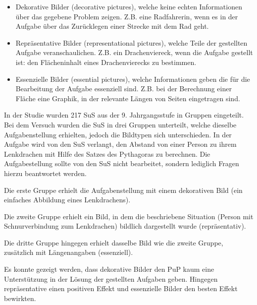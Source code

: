     \begin{itemize}
        \item Dekorative Bilder (decorative pictures), welche keine echten Informationen über das gegebene Problem zeigen. Z.B. eine Radfahrerin, wenn es in der Aufgabe über das Zurücklegen einer Strecke mit dem Rad geht.
        \item Repräsentative Bilder (representational pictures), welche Teile der gestellten Aufgabe veranschaulichen. Z.B. ein Drachenviereck, wenn die Aufgabe gestellt ist: den Flächeninhalt eines Drachenvierecks zu bestimmen. 
        \item Essenzielle Bilder (essential pictures), welche Informationen geben die für die Bearbeitung der Aufgabe essenziell sind. Z.B. bei der Berechnung einer Fläche eine Graphik, in der relevante Längen von Seiten eingetragen sind.
    \end{itemize}

In der Studie wurden 217 \gls{SuS} aus der 9. Jahrgangsstufe in Gruppen eingeteilt. Bei dem Versuch wurden die \gls{SuS} in drei Gruppen unterteilt, welche dieselbe Aufgabenstellung erhielten, jedoch die Bildtypen sich unterschieden. In der Aufgabe wird von den \gls{SuS} verlangt, den Abstand von einer Person zu ihrem Lenkdrachen mit Hilfe des Satzes des Pythagoras zu berechnen. Die Aufgabestellung sollte von den \gls{SuS} nicht bearbeitet, sondern lediglich Fragen hierzu beantwortet werden. 


Die erste Gruppe erhielt die Aufgabenstellung mit einem dekorativen Bild (ein einfaches Abbildung eines Lenkdrachens).


Die zweite Gruppe erhielt ein Bild, in dem die beschriebene Situation (Person mit Schnurverbindung zum Lenkdrachen) bildlich dargestellt wurde (repräsentativ).


Die dritte Gruppe hingegen erhielt dasselbe Bild wie die zweite Gruppe, zusätzlich mit Längenangaben (essenziell).


Es konnte gezeigt werden, dass dekorative Bilder den \gls{PuP} kaum eine Unterstützung in der Lösung der gestellten Aufgaben geben. Hingegen repräsentative einen positiven Effekt und essenzielle Bilder den besten Effekt bewirkten\cite{bockmannvalue}.

